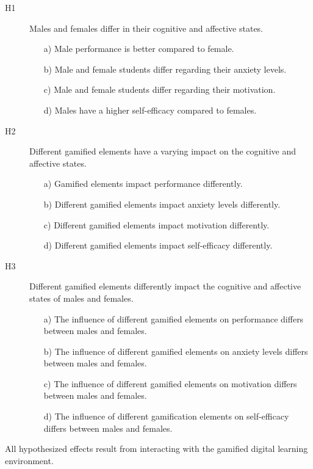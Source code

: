 \begin{description}
    \item[H1] Males and females differ in their cognitive and affective states.
    \begin{itemize}
        \item[a)] Male performance is better compared to female.
        \item[b)] Male and female students differ regarding their anxiety levels.
        \item[c)] Male and female students differ regarding their motivation.
        \item[d)] Males have a higher self-efficacy compared to females.
    \end{itemize}
    \item[H2] Different gamified elements have a varying impact on the cognitive and affective states.
    \begin{itemize}
        \item[a)] Gamified elements impact performance differently.
        \item[b)] Different gamified elements impact anxiety levels differently.
        \item[c)] Different gamified elements impact motivation differently.
        \item[d)] Different gamified elements impact self-efficacy differently.
    \end{itemize}
    \item[H3] Different gamified elements differently impact the cognitive and affective states of males and females.
    \begin{itemize}
        \item[a)] The influence of different gamified elements on performance differs between males and females.
        \item[b)] The influence of different gamified elements on anxiety levels differs between males and females.
        \item[c)] The influence of different gamified elements on motivation differs between males and females.
        \item[d)] The influence of different gamification elements on self-efficacy differs between males and females.
    \end{itemize}
\end{description}
All hypothesized effects result from interacting with the gamified digital learning environment.